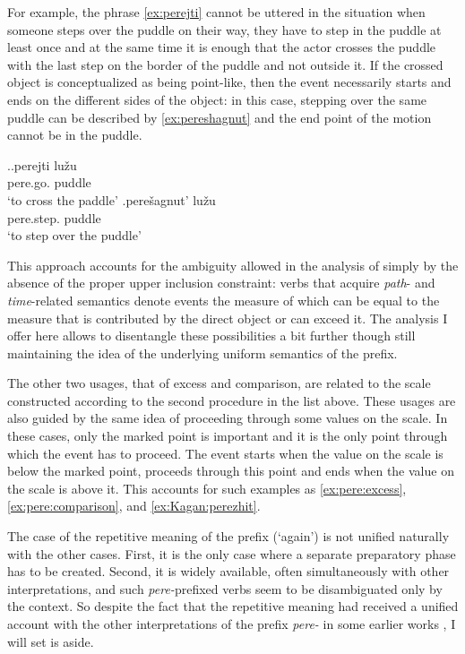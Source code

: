 For example, the phrase \ref{ex:perejti} cannot be uttered in the situation when someone steps over the puddle on their way, they have to step in the puddle at least once and at the same time it is enough that the actor crosses the puddle with the last step on the border of the puddle and not outside it. If the crossed object is conceptualized as being point-like, then the event necessarily starts and ends on the different sides of the object: in this case, stepping over the same puddle can be described by \ref{ex:pereshagnut} and the end point of the motion cannot be in the puddle.


\ex.\ag.\label{ex:perejti}perejti lu\v{z}u\\
pere.go. puddle\\
\trans `to cross the paddle'
\bg.\label{ex:pereshagnut}pere\v{s}agnut' lu\v{z}u\\
pere.step. puddle\\
\trans `to step over the puddle'

This approach accounts for the ambiguity allowed in the analysis of \citet{Kagan:book} simply by the absence of the proper upper inclusion constraint: verbs that acquire \textit{path}- and \textit{time}-related semantics denote events the measure of which can be equal to the measure that is contributed by the direct object or can exceed it. The analysis I offer here allows to disentangle these possibilities a bit further though still maintaining the idea of the underlying uniform semantics of the prefix.

The other two usages, that of excess and comparison, are related to the scale constructed according to the second procedure in the list above. These usages are also guided by the same idea of proceeding through some values on the scale. In these cases, only the marked point is important and it is the only point through which the event has to proceed. The event starts when the value on the scale is below the marked point, proceeds through this point and ends when the value on the scale is above it. This accounts for such examples as \ref{ex:pere:excess}, \ref{ex:pere:comparison}, and \ref{ex:Kagan:perezhit}.

The case of the repetitive meaning of the prefix (`again') is not unified naturally with the other cases. First, it is the only case where a separate preparatory phase has to be created. Second, it is widely available, often simultaneously with other interpretations, and such \textit{pere-}prefixed verbs seem to be disambiguated only by the context. So despite the fact that the repetitive meaning had received a unified account with the other interpretations of the prefix \textit{pere-} in some earlier works \citep{Demjjanow:97, Kagan:book}, I will set is aside.

